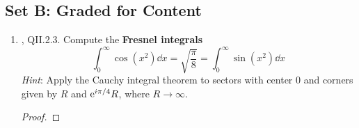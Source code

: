 \documentclass[../psets.tex]{subfiles}
\begin{document}
\subsection*{Set B: Graded for Content}
\begin{enumerate}[label={\textbf{\arabic*.}}]
    \item \textcite{bib:FischerLieb}, QII.2.3. Compute the \textbf{Fresnel integrals}
    \begin{equation*}
        \int_0^\infty\cos(x^2)\dd{x} = \sqrt{\frac{\pi}{8}}
        = \int_0^\infty\sin(x^2)\dd{x}
    \end{equation*}
    \emph{Hint}: Apply the Cauchy integral theorem to sectors with center 0 and corners given by $R$ and $\e[i\pi/4]R$, where $R\to\infty$.
    \begin{proof}


\end{proof}
\end{enumerate}
\end{document}
